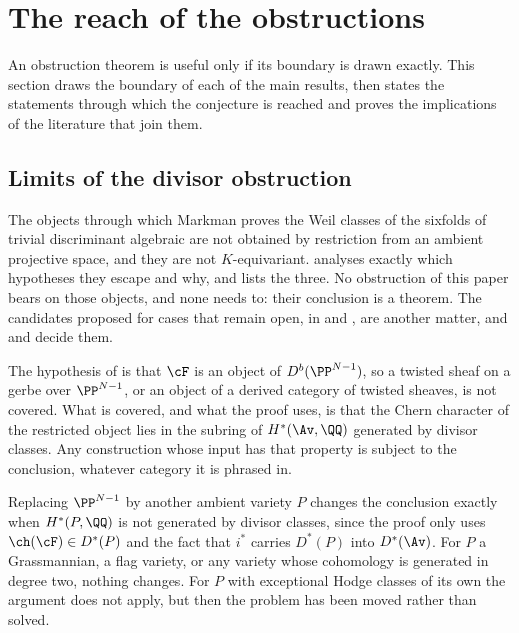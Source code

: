 \section{The reach of the obstructions}\label{sec:scope}

An obstruction theorem is useful only if its boundary is drawn exactly. This
section draws the boundary of each of the main results, then states the
statements through which the conjecture is reached and proves the
implications of the literature that join them.

\subsection{Limits of the divisor obstruction}

\begin{remark}\label{rem:markmanscope}
The objects through which Markman proves the Weil classes of the sixfolds of
trivial discriminant algebraic \cite{Mar25a,Mar25b} are not obtained by
restriction from an ambient projective space, and they are not
$K$-equivariant. \cite[Section~13]{paperI} analyses exactly which hypotheses they
escape and why, and \cite[Proposition~13.5]{paperI} lists the three. No obstruction
of this paper bears on those objects, and none needs to: their conclusion is
a theorem. The candidates proposed for cases that remain open, in
\cite[Section~12]{Mar25b} and \cite[Example~11.2.7]{Mar25c}, are another
matter, and  and 
decide them.
\end{remark}

\begin{remark}\label{rem:twisted}
The hypothesis of \cite[Theorem~7.3]{paperI} is that $\cF$ is an object of
$D^{b}(\PP^{N-1})$, so a twisted sheaf on a gerbe over $\PP^{N-1}$, or an
object of a derived category of twisted sheaves, is not covered. What is
covered, and what the proof uses, is that the Chern character of the
restricted object lies in the subring of $H^{*}(\Av,\QQ)$ generated by
divisor classes. Any construction whose input has that property is subject to
the conclusion, whatever category it is phrased in.
\end{remark}

\begin{remark}\label{rem:otherambient}
Replacing $\PP^{N-1}$ by another ambient variety $P$ changes the conclusion
exactly when $H^{*}(P,\QQ)$ is not generated by divisor classes, since the
proof only uses $\ch(\cF)\in D^{*}(P)$ and the fact that $i^{*}$ carries
$D^{*}(P)$ into $D^{*}(\Av)$. For $P$ a Grassmannian, a flag variety, or any
variety whose cohomology is generated in degree two, nothing changes. For $P$
with exceptional Hodge classes of its own the argument does not apply, but
then the problem has been moved rather than solved.
\end{remark}

